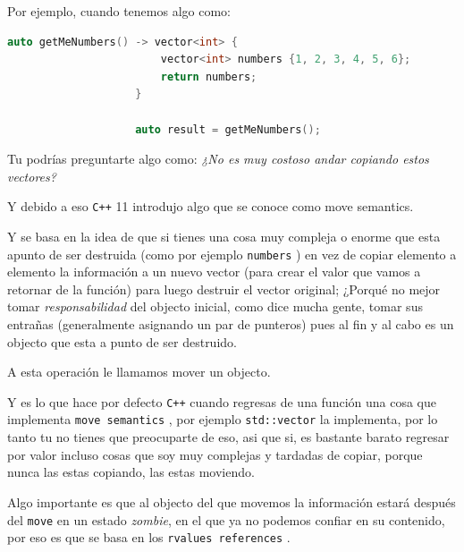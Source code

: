 \documentclass[12pt, fleqn]{report}                             %
\theoremstyle{break}                                            %
\newcommand{\textCode}[1]  { \texttt{#1} }                      %
\newcommand{\Cpp}{\ignorespaces\textCode{C++}}                  %
\begin{document}
                Por ejemplo, cuando tenemos algo como:
                \begin{lstlisting}[language=C++, gobble=20]
                    auto getMeNumbers() -> vector<int> {
                        vector<int> numbers {1, 2, 3, 4, 5, 6};
                        return numbers;
                    }

                    auto result = getMeNumbers();
                \end{lstlisting}

                Tu podrías preguntarte algo como:
                \textit{
                    ¿No es muy costoso andar copiando estos vectores? 
                }

                Y debido a eso \Cpp 11 introdujo algo que se conoce como move semantics.

                Y se basa en la idea de que si tienes una cosa muy compleja o enorme
                que esta apunto de ser destruida (como por ejemplo \textCode{numbers})
                en vez de copiar elemento a elemento la información a un nuevo vector (para crear
                el valor que vamos a retornar de la función) 
                para luego destruir el vector original; ¿Porqué no mejor tomar \emph{responsabilidad}
                del objecto inicial, como dice mucha gente, tomar sus entrañas  
                (generalmente asignando un par de punteros) pues al fin y al cabo es un objecto que esta a punto
                de ser destruido. 

                A esta operación le llamamos mover un objecto.

                \cite{ModernCppWhatYouNeedToKnow}

                Y es lo que hace por defecto \Cpp cuando regresas de una función una cosa que implementa
                \textCode{move semantics}, por ejemplo \textCode{std::vector} la implementa, por lo tanto
                tu no tienes que preocuparte de eso, asi que si, es bastante barato regresar por valor
                incluso cosas que soy muy complejas y tardadas de copiar, porque nunca las estas copiando, 
                las estas moviendo.

                Algo importante es que al objecto del que movemos la información estará después del
                \textCode{move} en un estado \emph{zombie}, en el que ya no podemos confiar en su contenido, 
                por eso es que se basa en los \textCode{rvalues references}.
\end{document}
